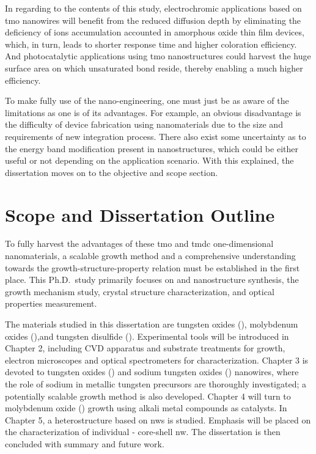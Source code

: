 In regarding to the contents of this study, electrochromic applications based on \gls{tmo} nanowires will benefit from the reduced diffusion depth by eliminating the deficiency of ions accumulation accounted in amorphous oxide thin film devices, which, in turn, leads to shorter response time and higher coloration efficiency.\cite{Huang2008a,Scherer2012} And photocatalytic applications using \gls{tmo} nanostructures could harvest the huge surface area on which unsaturated bond reside, thereby enabling a much higher efficiency.\cite{Mills1993,Merki2011,Chen2011b}

To make fully use of the nano-engineering, one must just be as aware of the limitations as one is of its advantages. For example, an obvious disadvantage is the difficulty of device fabrication using nanomaterials due to the size and requirements of new integration process. There also exist some uncertainty as to the energy band modification present in nanostructures, which could be either useful or not depending on the application scenario.\cite{Wang2012} With this explained, the dissertation moves on to the objective and scope section. 

\section{Scope and Dissertation Outline}
To fully harvest the advantages of these \gls{tmo} and \gls{tmdc} one-dimensional nanomaterials, a scalable growth method and a comprehensive understanding towards the growth-structure-property relation must be established in the first place. This Ph.D.\ study primarily focuses on  and  nanostructure synthesis, the growth mechanism study, crystal structure characterization, and optical properties measurement.

The materials studied in this dissertation are tungsten oxides (), molybdenum oxides (),and tungsten disulfide (). Experimental tools will be introduced in Chapter 2, including CVD apparatus and substrate treatments for growth, electron microscopes and optical spectrometers for characterization. Chapter 3 is devoted to tungsten oxides () and sodium tungsten oxides () nanowires, where the role of sodium in metallic tungsten precursors are thoroughly investigated; a potentially scalable growth method is also developed. Chapter 4 will turn to molybdenum oxide () growth using alkali metal compounds as catalysts. In Chapter 5, a heterostructure based on  \glspl{nw} is studied. Emphasis will be placed on the characterization of individual - core-shell \gls{nw}. The dissertation is then concluded with summary and future work. 
